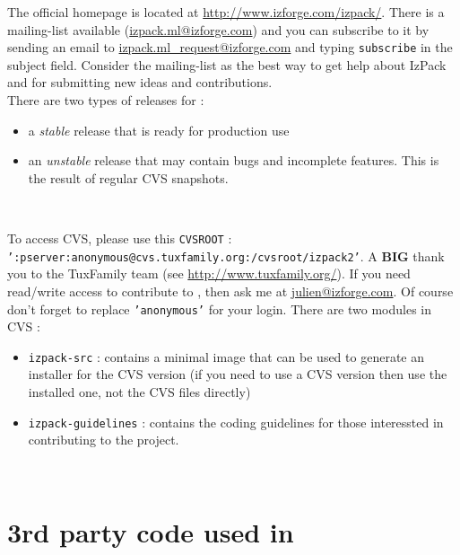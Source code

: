 The official \IzPack homepage is located at
\mbox{\url{http://www.izforge.com/izpack/}}. There is a mailing-list available 
(\url{izpack.ml@izforge.com}) and you can subscribe to it by sending an email to
\url{izpack.ml_request@izforge.com} and typing \texttt{subscribe} in the 
subject field. Consider the mailing-list as the best way to get help about
IzPack and for submitting new ideas and contributions.\\

There are two types of releases for \IzPack :
\begin{itemize}
  \item a \textit{stable} release that is ready for production use
  \item an \textit{unstable} release that may contain bugs and incomplete
  features. This is the result of regular CVS snapshots.
\end{itemize}\

To access CVS, please use this \texttt{CVSROOT} :\\
\texttt{':pserver:anonymous@cvs.tuxfamily.org:/cvsroot/izpack2'}. A \textbf{BIG}
thank you to the TuxFamily team (see \url{http://www.tuxfamily.org/}). If you need
read/write access to contribute to \IzPack, then ask me at
\url{julien@izforge.com}. Of course don't forget to replace \texttt{'anonymous'}
for your login. There are two modules in CVS :
\begin{itemize}
  \item \texttt{izpack-src} : contains a minimal image that can be used to
  generate an installer for the \IzPack CVS version (if you need to use a
  CVS version then use the installed one, not the CVS files directly)
  \item \texttt{izpack-guidelines} : contains the \IzPack coding guidelines
  for those interessted in contributing to the project.
\end{itemize}\

\section*{3rd party code used in \IzPack}

